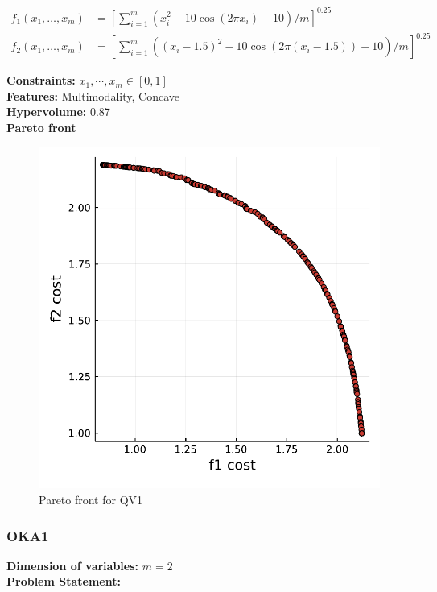 \documentclass[11pt,oneside,onecolumn,openright]{article}
\begin{document}
  \begin{equation}
  \begin{aligned}
  f_{1}\left(x_{1}, \ldots, x_{m}\right) &=\left[\sum_{i=1}^{m}\left(x_{i}^{2}-10 \cos \left(2 \pi x_{i}\right)+10\right) / m\right]^{0.25} \\
  f_{2}\left(x_{1}, \ldots, x_{m}\right) &=\left[\sum_{i=1}^{m}\left(\left(x_{i}-1.5\right)^{2}-10 \cos \left(2 \pi\left(x_{i}-1.5\right)\right)+10\right) / m\right]^{0.25}
  \end{aligned}
  \end{equation}

  \noindent\textbf{Constraints: } $x_{1},\cdots , x_{m} \in[0,1]$\\
  \noindent\textbf{Features: } Multimodality, Concave\\
  \noindent\textbf{Hypervolume: } 0.87\\
  \noindent\textbf{Pareto front}
      \begin{figure}[H]
      \centering
      \includegraphics[width=12cm]{fig/QV1.pdf}
      \cprotect\caption{Pareto front for QV1}
      \end{figure}


   \subsubsection{OKA1~\cite{davidor1994parallel}}
   \textbf{Dimension of variables: }$m=2$\\
  \noindent\textbf{Problem Statement: }
\end{document}
